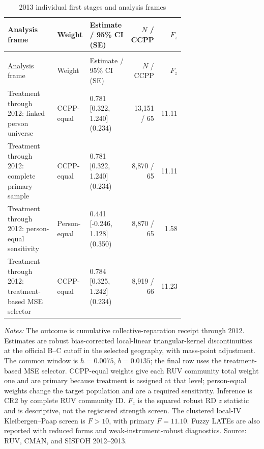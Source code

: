 \begingroup\fontsize{9.25}{11.4}\selectfont
\setlength{\tabcolsep}{3pt}\renewcommand{\arraystretch}{1.18}
\begin{longtable}{@{}>{\raggedright\arraybackslash}p{0.31\linewidth}p{0.14\linewidth}p{0.24\linewidth}rr@{}}
\caption{2013 individual first stages and analysis frames}\label{tab:pub_A16} \\
\toprule Analysis frame & Weight & Estimate / 95\% CI (SE) & \(N\) / CCPP & \(F_z\) \\ \midrule\endfirsthead
\multicolumn{5}{c}{\tablename\ \thetable{} -- continued} \\
\toprule Analysis frame & Weight & Estimate / 95\% CI (SE) & \(N\) / CCPP & \(F_z\) \\ \midrule\endhead
Treatment through 2012: linked person universe & CCPP-equal & \shortstack[r]{0.781 \\{} [0.322, 1.240] \\{} (0.234)} & 13,151 / 65 & 11.11 \\
Treatment through 2012: complete primary sample & CCPP-equal & \shortstack[r]{0.781 \\{} [0.322, 1.240] \\{} (0.234)} & 8,870 / 65 & 11.11 \\
Treatment through 2012: person-equal sensitivity & Person-equal & \shortstack[r]{0.441 \\{} [-0.246, 1.128] \\{} (0.350)} & 8,870 / 65 & 1.58 \\
Treatment through 2012: treatment-based MSE selector & CCPP-equal & \shortstack[r]{0.784 \\{} [0.325, 1.242] \\{} (0.234)} & 8,919 / 66 & 11.23 \\
\bottomrule\end{longtable}
\parbox{0.97\linewidth}{\footnotesize \textit{Notes:} The outcome is cumulative collective-reparation receipt through 2012. Estimates are robust bias-corrected local-linear triangular-kernel discontinuities at the official B--C cutoff in the selected geography, with mass-point adjustment. The common window is \(h=0.0075\), \(b=0.0135\); the final row uses the treatment-based MSE selector. CCPP-equal weights give each RUV community total weight one and are primary because treatment is assigned at that level; person-equal weights change the target population and are a required sensitivity. Inference is CR2 by complete RUV community ID. \(F_z\) is the squared robust RD \(z\) statistic and is descriptive, not the registered strength screen. The clustered local-IV Kleibergen--Paap screen is \(F>10\), with primary \(F=11.10\). Fuzzy LATEs are also reported with reduced forms and weak-instrument-robust diagnostics. Source: RUV, CMAN, and SISFOH 2012--2013.}
